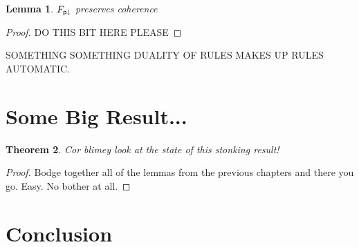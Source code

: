 \documentclass[12pt, oneside]{article}
\theoremstyle{plain}
\newtheorem{theorem}{Theorem}[section]
\newtheorem{lemma}[theorem]{Lemma}
\theoremstyle{definition}
\begin{document}
\begin{lemma}
    $F_{{\mathsf p}{\downarrow}}$ preserves coherence
\end{lemma}

\begin{proof}
    DO THIS BIT HERE PLEASE
\end{proof}

SOMETHING SOMETHING DUALITY OF RULES MAKES UP RULES AUTOMATIC.

\newpage
\section{Some Big Result...}

\begin{theorem}
    Cor blimey look at the state of this stonking result!
\end{theorem}

\begin{proof}
    Bodge together all of the lemmas from the previous chapters and there you go.
    Easy.
    No bother at all.
\end{proof}

\newpage
\section{Conclusion}

\newpage


\end{document}
